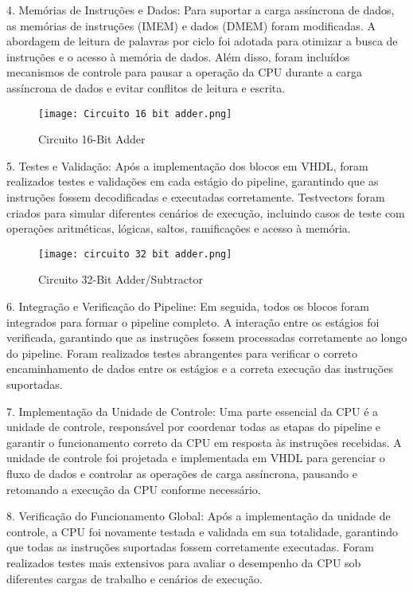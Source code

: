 \documentclass[12pt]{article}
\begin{document}
4. Memórias de Instruções e Dados:
Para suportar a carga assíncrona de dados, as memórias de instruções (IMEM) e dados (DMEM) foram modificadas. A abordagem de leitura de palavras por ciclo foi adotada para otimizar a busca de instruções e o acesso à memória de dados. Além disso, foram incluídos mecanismos de controle para pausar a operação da CPU durante a carga assíncrona de dados e evitar conflitos de leitura e escrita.

\begin{figure}[h]
    \centering
    \texttt{[image: Circuito 16 bit adder.png]}
    \caption{Circuito 16-Bit Adder}
\end{figure}


5. Testes e Validação:
Após a implementação dos blocos em VHDL, foram realizados testes e validações em cada estágio do pipeline, garantindo que as instruções fossem decodificadas e executadas corretamente. Testvectors foram criados para simular diferentes cenários de execução, incluindo casos de teste com operações aritméticas, lógicas, saltos, ramificações e acesso à memória.

\newpage
\newpage

\begin{figure}[h]
    \centering
    \texttt{[image: circuito 32 bit adder.png]}
    \caption{Circuito 32-Bit Adder/Subtractor}
\end{figure}

6. Integração e Verificação do Pipeline:
Em seguida, todos os blocos foram integrados para formar o pipeline completo. A interação entre os estágios foi verificada, garantindo que as instruções fossem processadas corretamente ao longo do pipeline. Foram realizados testes abrangentes para verificar o correto encaminhamento de dados entre os estágios e a correta execução das instruções suportadas.

7. Implementação da Unidade de Controle:
Uma parte essencial da CPU é a unidade de controle, responsável por coordenar todas as etapas do pipeline e garantir o funcionamento correto da CPU em resposta às instruções recebidas. A unidade de controle foi projetada e implementada em VHDL para gerenciar o fluxo de dados e controlar as operações de carga assíncrona, pausando e retomando a execução da CPU conforme necessário.

8. Verificação do Funcionamento Global:
Após a implementação da unidade de controle, a CPU foi novamente testada e validada em sua totalidade, garantindo que todas as instruções suportadas fossem corretamente executadas. Foram realizados testes mais extensivos para avaliar o desempenho da CPU sob diferentes cargas de trabalho e cenários de execução.
\end{document}
